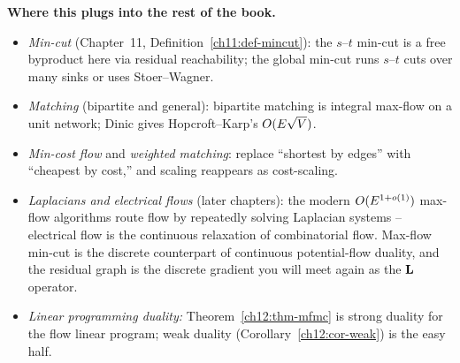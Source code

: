 \begin{connectionbox}
\textbf{Where this plugs into the rest of the book.}
\begin{itemize}
  \item \emph{Min-cut} (Chapter~11, Definition~\ref{ch11:def-mincut}): the $s$--$t$ min-cut is a
        free byproduct here via residual reachability; the global min-cut runs $s$--$t$
        cuts over many sinks or uses Stoer--Wagner.
  \item \emph{Matching} (bipartite and general): bipartite matching is integral
        max-flow on a unit network; Dinic gives Hopcroft--Karp's $O(E\sqrt V)$.
  \item \emph{Min-cost flow} and \emph{weighted matching}: replace ``shortest by
        edges'' with ``cheapest by cost,'' and scaling reappears as cost-scaling.
  \item \emph{Laplacians and electrical flows} (later chapters): the modern
        $O(E^{1+o(1)})$ max-flow algorithms route flow by repeatedly solving
        Laplacian systems -- electrical flow is the continuous relaxation of
        combinatorial flow. Max-flow min-cut is the discrete counterpart of
        continuous potential-flow duality, and the residual graph is the discrete
        gradient you will meet again as the $\mathbf{L}$ operator.
  \item \emph{Linear programming duality:} Theorem~\ref{ch12:thm-mfmc} is strong duality for the
        flow linear program; weak duality (Corollary~\ref{ch12:cor-weak}) is the easy half.
\end{itemize}
\end{connectionbox}

